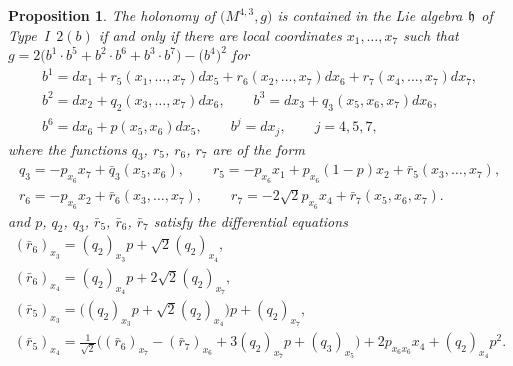 \documentclass[pdftex]{sigma}
\numberwithin{equation}{section}
\newtheorem{Proposition}[Theorem]{Proposition}
 { \theoremstyle{definition}
\newtheorem{Definition}[Theorem]{Definition}
\newtheorem{Example}[Theorem]{Example}
\newtheorem{Remark}[Theorem]{Remark} }
\newcommand\fh{{\frak h}}
\begin{document}
\begin{Proposition} \label{prop2.2} The holonomy of $\big(M^{4,3},g\big)$ is contained in the Lie algebra $\fh$ of Type~I~$2(b)$ if and only if there are local coordinates $x_1,\dots,x_7$ such that $g=2\big(b^1\cdot b^5+b^2\cdot b^6+b^3\cdot b^7\big)- \big(b^4\big)^2$ for
\begin{gather}
b^1 = dx_1+r_5(x_1,\dots,x_7)dx_5+r_6(x_2,\dots,x_7)dx_6+r_7(x_4,\dots,x_7)dx_7, \nonumber \\
b^2 =dx_2+ q_2(x_3,\dots,x_7)dx_6, \qquad b^3 =dx_3+ q_3(x_5,x_6,x_7)dx_6, \label{Eb}\\
b^6 =dx_6+p(x_5,x_6)dx_5, \qquad b^j =dx_j, \qquad j=4,5,7, \nonumber
\end{gather}
where the functions $q_3$, $r_5$, $r_6$, $r_7$ are of the form
\begin{gather*}
q_3= -p_{x_6}x_7+\bar q_3(x_5,x_6),\qquad
r_5= -p_{x_6} x_1 +p_{x_6}(1-p)x_2+\bar r_5(x_3,\dots,x_7),\\
r_6= -p_{x_6}x_2 +\bar r_6(x_3,\dots, x_7),\qquad
r_7= -2\sqrt2 p_{x_6}x_4 +\bar r_7(x_5,x_6,x_7).
\end{gather*}
and $p$, $q_2$, $q_3$, $\bar r_5$, $\bar r_6$, $\bar r_7$ satisfy the differential equations
\begin{gather}
(\bar r_6)_{x_3}= (q_2)_{x_3}p+ {\sqrt2}(q_2)_{x_4}, \label{Esysta}\\
(\bar r_6)_{x_4}=(q_2)_{x_4}p+2\sqrt 2(q_2)_{x_7},\label{Esyst2}\\
(\bar r_5)_{x_3} =\big((q_2)_{x_3}p+ {\sqrt2}(q_2)_{x_4}\big)p+ (q_2)_{x_7}, \label{Esyst3}\\
(\bar r_5)_{x_4}= \tfrac 1{\sqrt2} \big((\bar r_6)_{x_7} - (\bar r_7)_{x_6} +3 (q_2)_{x_7}p +(q_3)_{x_5}\big) +2p_{x_6 x_6} x_4 +(q_2)_{x_4} p^2.\label{Esyste}
\end{gather}
\end{Proposition}
\end{document}
